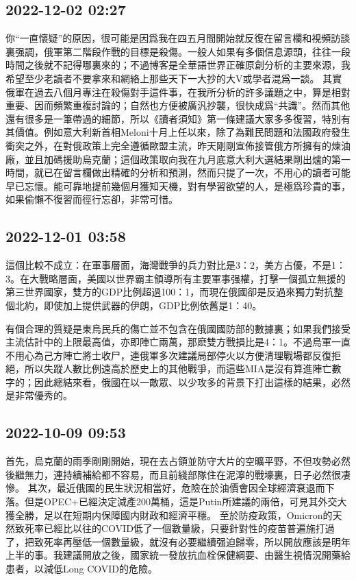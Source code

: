 \documentclass[twocolumn]{ctexart}
\begin{document}
\subsection*{2022-12-02 02:27}

你“一直懷疑”的原因，很可能是因爲我在四五月間開始就反復在留言欄和視頻訪談裏强調，俄軍第二階段作戰的目標是殺傷。一般人如果有多個信息源頭，往往一段時間之後就不記得哪裏來的；不過博客是全華語世界正確原創分析的主要來源，我希望至少老讀者不要拿來和網絡上那些天下一大抄的大V或學者混爲一談。
其實俄軍在過去八個月專注在殺傷對手這件事，在我所分析的許多議題之中，算是相對重要、因而頻繁重複討論的；自然也方便被廣汎抄襲，很快成爲“共識”。然而其他還有很多是一筆帶過的細節，所以《讀者須知》第一條建議大家多多復習，特別有其價值。例如意大利新首相Meloni十月上任以來，除了為難民問題和法國政府發生衝突之外，在對俄政策上完全遵循歐盟主流，昨天剛剛宣佈接管俄方所擁有的煉油廠，並且加碼援助烏克蘭；這個政策取向我在九月底意大利大選結果剛出爐的第一時間，就已在留言欄做出精確的分析和預測，然而只提了一次，不用心的讀者可能早已忘懷。能可靠地提前幾個月獲知天機，對有學習欲望的人，是極爲珍貴的事，如果偷懶不復習而徑行忘卻，非常可惜。
\subsection*{2022-12-01 03:58}

這個比較不成立：在軍事層面，海灣戰爭的兵力對比是3：2，美方占優，不是1：3。在大戰略層面，美國以世界霸主領導所有主要軍事强權，打擊一個孤立無援的第三世界國家，雙方的GDP比例超過100：1，而現在俄國卻是反過來獨力對抗整個北約，即使加上提供武器的伊朗，GDP比例依舊是1：40。

有個合理的質疑是東烏民兵的傷亡並不包含在俄國國防部的數據裏；如果我們接受主流估計中的上限最高值，亦即陣亡兩萬，那麽雙方戰損比是4：1。不過烏軍一直不用心為己方陣亡將士收尸，連俄軍多次建議局部停火以方便清理戰場都反復拒絕，所以失蹤人數比例遠高於歷史上的其他戰爭，而這些MIA是沒有算進陣亡數字的；因此總結來看，俄國在以一敵眾、以少攻多的背景下打出這樣的結果，必然是非常優秀的。
\subsection*{2022-10-09 09:53}

首先，烏克蘭的雨季剛剛開始，現在去占領並防守大片的空曠平野，不但攻勢必然後繼無力，連持續補給都不容易，而且前綫部隊住在泥濘的戰壕裏，日子必然很凄慘。
其次，最近俄國的民生狀況相當好，危險在於油價會因全球經濟衰退而下落。但是OPEC+已經決定減產200萬桶，這是Putin所建議的兩倍，可見其外交大獲全勝，足以在短期内保障國内財政和經濟平穩。
至於防疫政策，Omicron的天然致死率已經比以往的COVID低了一個數量級，只要針對性的疫苗普遍施打過了，把致死率再壓低一個數量級，就沒有必要繼續强迫歸零，所以開放應該是明年上半的事。我建議開放之後，國家統一發放抗血栓保健綱要、由醫生視情況開藥給患者，以減低Long COVID的危險。
\end{document}
